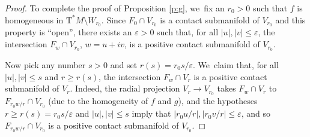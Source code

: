 \documentclass[10pt]{amsart}
\newcommand{\sT}{\mathrm{T}^\ast}
\let\eps\varepsilon
\theoremstyle{plain}
\theoremstyle{definition}
\begin{document}
\begin{proof}
To complete the proof of Proposition \ref{p:g}, we~fix an $r_0>0$ such
that $f$ is homogeneous in $\sT M \setminus W_{r_0}$. Since $F_0 \cap V_{r_0}$ is a
contact submanifold of $V_{r_0}$ and this property is ``open'', there exists an
$\eps>0$ such that, for all $|u|, |v| \le \eps$, the intersection $F_w \cap
V_{r_0}$, $w = u+iv$, is a positive contact submanifold of $V_{r_0}$.

Now pick any number $s>0$ and set $r(s) = r_0 s / \eps$. We~claim that, for all
\hbox{$|u|, |v| \le s$} and $r \ge r(s)$, the intersection $F_w \cap V_r$ is a positive
contact submanifold of $V_r$. Indeed, the radial projection $V_r \to V_{r_0}$
takes $F_w \cap V_r$ to $F_{r_0w/r} \cap V_{r_0}$ (due to the homogeneity of $f$
and $g$), and the hypotheses $r \ge r(s) = r_0 s / \eps$ and $|u|, |v| \le s$
imply that $|r_0u/r|, |r_0v/r| \le \eps$, and so $F_{r_0w/r} \cap V_{r_0}$ is a
positive contact submanifold of $V_{r_0}$.
\end{proof}
\end{document}
